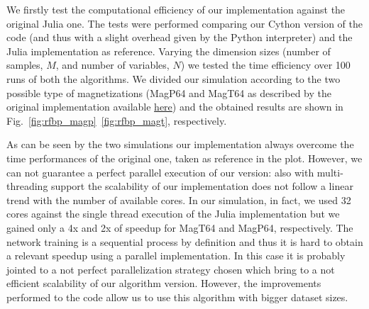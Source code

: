 \documentclass{standalone}
\begin{document}
We firstly test the computational efficiency of our implementation against the original \textsf{Julia} one.
The tests were performed comparing our \textsf{Cython} version of the code (and thus with a slight overhead given by the \textsf{Python} interpreter) and the \textsf{Julia} implementation as reference.
Varying the dimension sizes (number of samples, $M$, and number of variables, $N$) we tested the time efficiency over 100 runs of both the algorithms.
We divided our simulation according to the two possible type of magnetizations (\textsf{MagP64} and \textsf{MagT64} as described by the original implementation available \href{https://github.com/carlobaldassi/BinaryCommitteeMachineFBP.jl}{here}) and the obtained results are shown in Fig.~\ref{fig:rfbp_magp}~\ref{fig:rfbp_magt}, respectively.

As can be seen by the two simulations our implementation always overcome the time performances of the original one, taken as reference in the plot.
However, we can not guarantee a perfect parallel execution of our version: also with multi-threading support the scalability of our implementation does not follow a linear trend with the number of available cores.
In our simulation, in fact, we used 32 cores against the single thread execution of the \textsf{Julia} implementation but we gained only a 4x and 2x of speedup for \textsf{MagT64} and \textsf{MagP64}, respectively.
The network training is a sequential process by definition and thus it is hard to obtain a relevant speedup using a parallel implementation.
In this case it is probably jointed to a not perfect parallelization strategy chosen which bring to a not efficient scalability of our algorithm version.
However, the improvements performed to the code allow us to use this algorithm with bigger dataset sizes.
\end{document}
